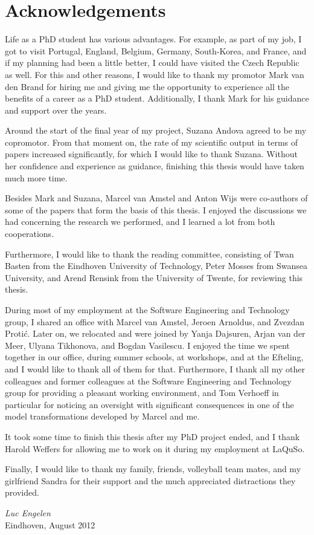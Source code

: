 \chapter*{Acknowledgements}
\setcounter{page}{1}

Life as a PhD student has various advantages.
For example, as part of my job, I got to visit Portugal, England, Belgium, Germany, South-Korea, and France, and if my planning had been a little better, I could have visited the Czech Republic as well.
For this and other reasons, I would like to thank my promotor Mark van den Brand for hiring me and giving me the opportunity to experience all the benefits of a career as a PhD student.
Additionally, I thank Mark for his guidance and support over the years.

Around the start of the final year of my project, Suzana Andova agreed to be my copromotor.
From that moment on, the rate of my scientific output in terms of papers increased significantly, for which I would like to thank Suzana.
Without her confidence and experience as guidance, finishing this thesis would have taken much more time.

Besides Mark and Suzana, Marcel van Amstel and Anton Wijs were co-authors of some of the papers that form the basis of this thesis.
I enjoyed the discussions we had concerning the research we performed, and I learned a lot from both cooperations.

Furthermore, I would like to thank the reading committee, consisting of Twan Basten from the Eindhoven University of Technology, Peter Mosses from Swansea University, and Arend Rensink from the University of Twente, for reviewing this thesis.

During most of my employment at the Software Engineering and Technology group, I shared an office with Marcel van Amstel, Jeroen Arnoldus, and Zvezdan Proti{\'c}.
Later on, we relocated and were joined by Yanja Dajsuren, Arjan van der Meer, Ulyana Tikhonova, and Bogdan Vasilescu.
I enjoyed the time we spent together in our office, during summer schools, at workshops, and at the Efteling, and I would like to thank all of them for that.
Furthermore, I thank all my other colleagues and former colleagues at the Software Engineering and Technology group for providing a pleasant working environment, and Tom Verhoeff in particular for noticing an oversight with significant consequences in one of the model transformations developed by Marcel and me.

It took some time to finish this thesis after my PhD project ended, and I thank Harold Weffers for allowing me to work on it during my employment at LaQuSo.

Finally, I would like to thank my family, friends, volleyball team mates, and my girlfriend Sandra for their support and the much appreciated distractions they provided.

\bigskip

\noindent
\emph{Luc Engelen}\\
Eindhoven, August 2012 